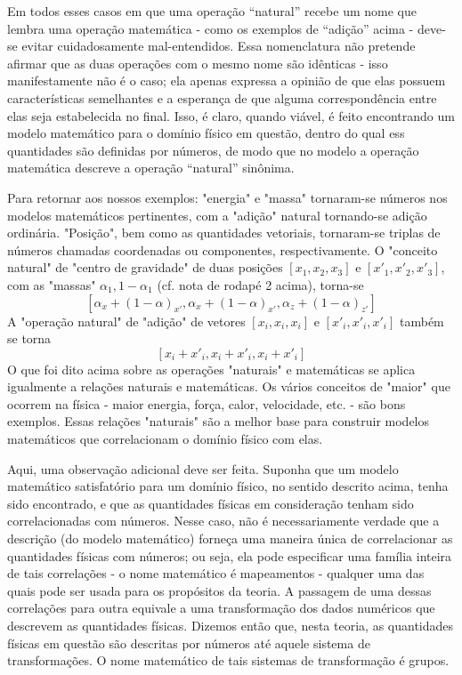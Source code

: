 \documentclass[a4paper,12pt]{article}[abntex2]
\begin{document}
Em todos esses casos em que uma operação “natural” recebe um nome que lembra uma operação matemática - como os exemplos de “adição” acima - deve-se evitar cuidadosamente mal-entendidos. Essa nomenclatura não pretende afirmar que as duas operações com o mesmo nome são idênticas - isso manifestamente não é o caso; ela apenas expressa a opinião de que elas possuem características semelhantes e a esperança de que alguma correspondência entre elas seja estabelecida no final. Isso, é claro, quando viável, é feito encontrando um modelo matemático para o domínio físico em questão, dentro do qual ess quantidades são definidas por números, de modo que no modelo a operação matemática descreve a operação “natural” sinônima.

Para retornar aos nossos exemplos: "energia" e "massa" tornaram-se números nos modelos matemáticos pertinentes, com a "adição" natural tornando-se adição ordinária. "Posição", bem como as quantidades vetoriais, tornaram-se triplas de números chamadas coordenadas ou componentes, respectivamente. O "conceito natural" de "centro de gravidade" de duas posições \( [x_1, x_2, x_3] \) e \( [x'_1, x'_2, x'_3] \), com as "massas" \( \alpha_1, 1 - \alpha_1 \) (cf. nota de rodapé 2 acima), torna-se
\[ [ \alpha_{x} + (1 - \alpha)_{x'}, \alpha_{x} + (1 - \alpha)_{x'}, \alpha_{z} + (1 - \alpha)_{z'} ] \]
A "operação natural" de "adição" de vetores \( [x_i, x_i, x_i] \) e \( [x'_i, x'_i, x'_i] \) também se torna
\[ [x_i + x'_i, x_i + x'_i, x_i + x'_i] \]
O que foi dito acima sobre as operações "naturais" e matemáticas se aplica igualmente a relações naturais e matemáticas. Os vários conceitos de "maior" que ocorrem na física - maior energia, força, calor, velocidade, etc. - são bons exemplos.
Essas relações "naturais" são a melhor base para construir modelos matemáticos que correlacionam o domínio físico com elas. 

Aqui, uma observação adicional deve ser feita. Suponha que um modelo matemático satisfatório para um domínio físico, no sentido descrito acima, tenha sido encontrado, e que as quantidades físicas em consideração tenham sido correlacionadas com números. Nesse caso, não é necessariamente verdade que a descrição (do modelo matemático) forneça uma maneira única de correlacionar as quantidades físicas com números; ou seja, ela pode especificar uma família inteira de tais correlações - o nome matemático é mapeamentos - qualquer uma das quais pode ser usada para os propósitos da teoria. A passagem de uma dessas correlações para outra equivale a uma transformação dos dados numéricos que descrevem as quantidades físicas. Dizemos então que, nesta teoria, as quantidades físicas em questão são descritas por números até aquele sistema de transformações. O nome matemático de tais sistemas de transformação é grupos.
\end{document}

